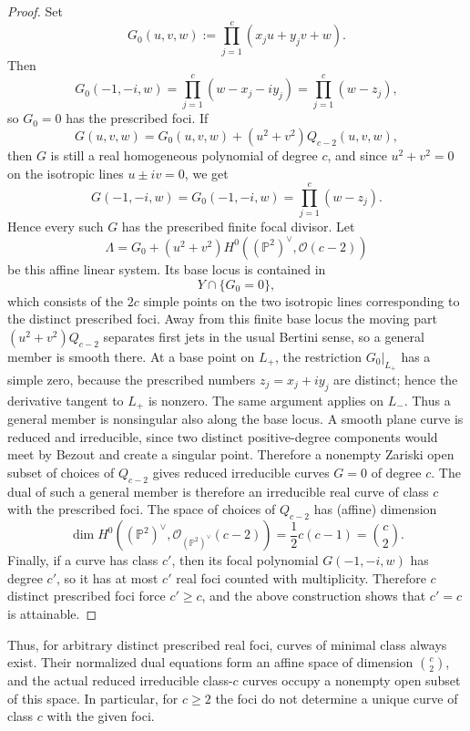 \documentclass[11pt]{amsart}
\theoremstyle{definition}
\theoremstyle{remark}
\begin{document}
\begin{proof}
Set
\[
G_0(u,v,w):=\prod_{j=1}^c (x_ju+y_jv+w).
\]
Then
\[
G_0(-1,-i,w)=\prod_{j=1}^c(w-x_j-iy_j)=\prod_{j=1}^c(w-z_j),
\]
so $G_0=0$ has the prescribed foci. If
\[
G(u,v,w)=G_0(u,v,w)+(u^2+v^2)Q_{c-2}(u,v,w),
\]
then $G$ is still a real homogeneous polynomial of degree $c$, and since $u^2+v^2=0$ on the isotropic lines $u \pm iv=0$, we get
\[
G(-1,-i,w)=G_0(-1,-i,w)=\prod_{j=1}^c(w-z_j).
\]
Hence every such $G$ has the prescribed finite focal divisor. Let
\[
\Lambda=G_0+(u^2+v^2)H^0((\mathbb P^2)^\vee,\mathcal O(c-2))
\]
be this affine linear system. Its base locus is contained in
\[
Y\cap\{G_0=0\},
\]
which consists of the $2c$ simple points on the two isotropic lines corresponding to the distinct prescribed foci. Away from this finite base locus the moving part $(u^2+v^2)Q_{c-2}$ separates first jets in the usual Bertini sense, so a general member is smooth there. At a base point on $L_+$, the restriction $G_0|_{L_+}$ has a simple zero, because the prescribed numbers $z_j=x_j+iy_j$ are distinct; hence the derivative tangent to $L_+$ is nonzero. The same argument applies on $L_-$. Thus a general member is nonsingular also along the base locus. A smooth plane curve is reduced and irreducible, since two distinct positive-degree components would meet by Bezout and create a singular point. Therefore a nonempty Zariski open subset of choices of $Q_{c-2}$ gives reduced irreducible curves $G=0$ of degree $c$.  The dual of such a general member is therefore an irreducible real curve of class $c$ with the prescribed foci. The space of choices of $Q_{c-2}$ has (affine) dimension
\[
\dim H^0((\mathbb P^2)^\vee,\mathcal O_{(\mathbb P^2)^\vee}(c-2))=\frac{1}2 c(c-1)=\binom{c}2.
\]
Finally, if a curve has class $c'$, then its focal polynomial $G(-1,-i,w)$ has degree $c'$, so it has at most $c'$ real foci counted with multiplicity. Therefore $c$ distinct prescribed foci force $c'\ge c$, and the above construction shows that $c'=c$ is attainable.
\end{proof}

Thus, for arbitrary distinct prescribed real foci, curves of minimal class always exist.
Their normalized dual equations form an affine space of dimension $\binom{c}{2}$, and the actual reduced irreducible class-$c$ curves occupy a nonempty open subset of this space. In particular, for $c\ge 2$
the foci do not determine a unique curve of class $c$ with the given foci. 
\end{document}
